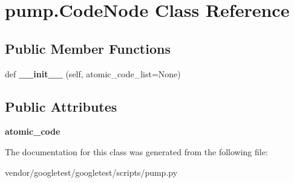 \hypertarget{classpump_1_1_code_node}{}\section{pump.\+Code\+Node Class Reference}
\label{classpump_1_1_code_node}
\subsection*{Public Member Functions}
\begin{DoxyCompactItemize}
\item 
\mbox{\label{classpump_1_1_code_node_a2ca8a75324a64e48004812d6c0bc1cbd}} 
def {\bfseries \+\_\+\+\_\+init\+\_\+\+\_\+} (self, atomic\+\_\+code\+\_\+list=None)
\end{DoxyCompactItemize}
\subsection*{Public Attributes}
\begin{DoxyCompactItemize}
\item 
\mbox{\label{classpump_1_1_code_node_ac7251110cc987c709e0e17d95521993e}} 
{\bfseries atomic\+\_\+code}
\end{DoxyCompactItemize}


The documentation for this class was generated from the following file\+:\begin{DoxyCompactItemize}
\item 
vendor/googletest/googletest/scripts/pump.\+py\end{DoxyCompactItemize}
